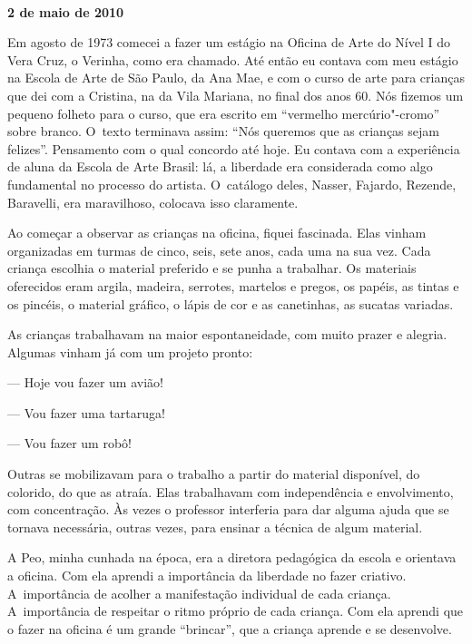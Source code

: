 \begin{center}\asterisc{}​\end{center}

\begin{flushright}\textbf{2 de maio de 2010}\end{flushright}


Em agosto de 1973 comecei a fazer um estágio na Oficina de Arte do Nível
I do Vera Cruz, o Verinha, como era chamado. Até então eu contava com
meu estágio na Escola de Arte de São Paulo, da Ana Mae, e com o curso de
arte para crianças que dei com a Cristina, na  da Vila Mariana, no
final dos anos 60. Nós fizemos um pequeno folheto para o curso, que era
escrito em ``vermelho mercúrio"-cromo'' sobre branco. O~texto terminava
assim: ``Nós queremos que as crianças sejam felizes''. Pensamento com o
qual concordo até hoje. Eu contava com a experiência de aluna da Escola
de Arte Brasil: lá, a liberdade era considerada como algo fundamental no
processo do artista. O~catálogo deles, Nasser, Fajardo, Rezende,
Baravelli, era maravilhoso, colocava isso claramente.

Ao começar a observar as crianças na oficina, fiquei fascinada. Elas
vinham organizadas em turmas de cinco, seis, sete anos, cada uma na sua
vez. Cada criança escolhia o material preferido e se punha a trabalhar.
Os materiais oferecidos eram argila, madeira, serrotes, martelos e
pregos, os papéis, as tintas e os pincéis, o material gráfico, o lápis
de cor e as canetinhas, as sucatas variadas.

As crianças trabalhavam na maior espontaneidade, com muito prazer e
alegria. Algumas vinham já com um projeto pronto:

--- Hoje vou fazer um avião!

--- Vou fazer uma tartaruga!

--- Vou fazer um robô!

Outras se mobilizavam para o trabalho a partir do material disponível,
do colorido, do que as atraía. Elas trabalhavam com independência e
envolvimento, com concentração. Às vezes o professor interferia para
dar alguma ajuda que se tornava necessária, outras vezes, para ensinar a
técnica de algum material.

A Peo, minha cunhada na época, era a diretora pedagógica da escola e
orientava a oficina. Com ela aprendi a importância da liberdade no fazer
criativo. A~importância de acolher a manifestação individual de cada
criança. A~importância de respeitar o ritmo próprio de cada criança. Com
ela aprendi que o fazer na oficina é um grande ``brincar'', que a
criança aprende e se desenvolve.

